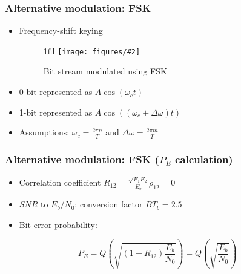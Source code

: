 \documentclass{beamer}
\makeatletter
\newcommand*{\centerfloat}{%
  \parindent \z@
  \leftskip \z@ \@plus 1fil \@minus \textwidth
  \rightskip\leftskip
  \parfillskip \z@skip}
\newcommand{\fig}[3]{
  \begin{figure}[H]
  \centerfloat
    \texttt{[image: figures/\#2]}
	\caption{#3}
  \end{figure}
}
\makeatother
\begin{document}
\begin{frame}
	\frametitle{Alternative modulation: FSK}
	\begin{itemize}
		\item Frequency-shift keying
		\fig{2.5cm}{fsk.png}{Bit stream modulated using FSK}
		\item 0-bit represented as $A\cos(\omega_c t)$
		\item 1-bit represented as $A\cos((\omega_c + \Delta \omega) t)$
		\item Assumptions: $\omega_c = \frac{2 \pi n}{T}$ and $\Delta\omega = \frac{2 \pi m}{T}$
	\end{itemize}
\end{frame}

\begin{frame}
	\frametitle{Alternative modulation: FSK ($P_E$ calculation)}
	\begin{itemize}
		\item Correlation coefficient $R_{12} = \frac{\sqrt{E_1 E_2}}{E_b}\rho_{12} = 0$
		\item $SNR$ to $E_b/N_0$: conversion factor $B T_b = 2.5$
		\item Bit error probability:
	\end{itemize}
	\begin{equation}
		P_E = Q\left(\sqrt{\left(1 - R_{12}\right) \frac{E_b}{N_0}}\right) = Q\left(\sqrt{\frac{E_b}{N_0}}\right)
	\end{equation}
\end{frame}
\end{document}
